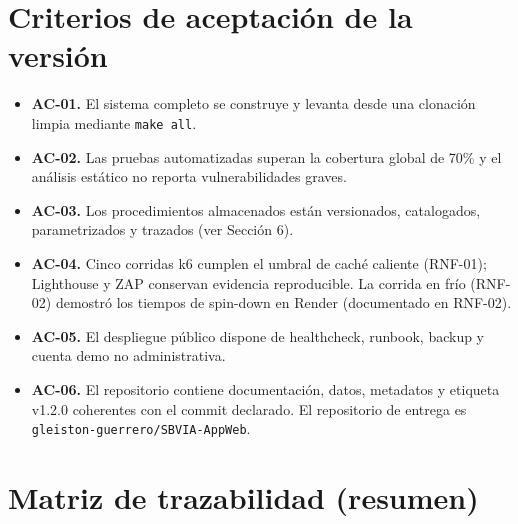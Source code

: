 \documentclass[11pt,a4paper]{article}
\begin{document}
\newpage
\section{Criterios de aceptación de la versión}
\begin{itemize}[label=\textbf{--}]
    \item \textbf{AC-01.} El sistema completo se construye y levanta desde una clonación limpia mediante \texttt{make all}.
    \item \textbf{AC-02.} Las pruebas automatizadas superan la cobertura global de 70\% y el análisis estático no reporta vulnerabilidades graves.
    \item \textbf{AC-03.} Los procedimientos almacenados están versionados, catalogados, parametrizados y trazados (ver Sección 6).
    \item \textbf{AC-04.} Cinco corridas k6 cumplen el umbral de caché caliente (RNF-01); Lighthouse y ZAP conservan evidencia reproducible. La corrida en frío (RNF-02) demostró los tiempos de spin-down en Render (documentado en RNF-02).
    \item \textbf{AC-05.} El despliegue público dispone de healthcheck, runbook, backup y cuenta demo no administrativa.
    \item \textbf{AC-06.} El repositorio contiene documentación, datos, metadatos y etiqueta v1.2.0 coherentes con el commit declarado. El repositorio de entrega es \texttt{gleiston-guerrero/SBVIA-AppWeb}.
\end{itemize}

\newpage
\section{Matriz de trazabilidad (resumen)}
\end{document}
